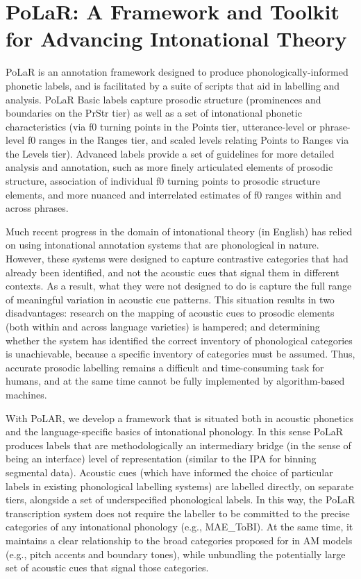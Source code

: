 \documentclass[11pt, twoside]{memoir}
\begin{document}
\section*{PoLaR: A Framework and Toolkit for Advancing Intonational Theory}
PoLaR is an annotation framework designed to produce phonologically-informed phonetic labels, and is facilitated by a suite of scripts that aid in labelling and analysis. PoLaR Basic labels capture prosodic structure (prominences and boundaries on the PrStr tier) as well as a set of intonational phonetic characteristics (via f0 turning points in the Points tier, utterance-level or phrase-level f0 ranges in the Ranges tier, and scaled levels relating Points to Ranges via the Levels tier). Advanced labels provide a set of guidelines for more detailed analysis and annotation, such as more finely articulated elements of prosodic structure, association of individual f0 turning points to prosodic structure elements, and more nuanced and interrelated estimates of f0 ranges within and across phrases.

Much recent progress in the domain of intonational theory (in English) has relied on using intonational annotation systems that are phonological in nature.  However, these systems were designed to capture contrastive categories that had already been identified, and not the acoustic cues that signal them in different contexts.  As a result, what they were not designed to do is capture the full range of meaningful variation in acoustic cue patterns. This situation results in two disadvantages: research on the mapping of acoustic cues to prosodic elements (both within and across language varieties) is hampered; and determining whether the system has identified the correct inventory of phonological categories is unachievable, because a specific inventory of categories must be assumed. Thus, accurate prosodic labelling remains a difficult and time-consuming task for humans, and at the same time cannot be fully implemented by algorithm-based machines.

With PoLAR, we develop a framework that is situated both in acoustic phonetics and the language-specific basics of intonational phonology. In this sense PoLaR produces labels that are methodologically an intermediary bridge (in the sense of being an interface) level of representation (similar to the IPA for binning segmental data). Acoustic cues (which have informed the choice of particular labels in existing phonological labelling systems) are labelled directly, on separate tiers, alongside a set of underspecified phonological labels. In this way, the PoLaR transcription system does not require the labeller to be committed to the precise categories of any intonational phonology (e.g., MAE\_ToBI). At the same time, it maintains a clear relationship to the broad categories proposed for in AM models (e.g., pitch accents and boundary tones), while unbundling the potentially large set of acoustic cues that signal those categories.
\end{document}
